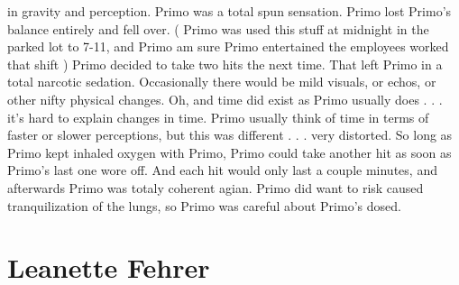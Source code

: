 \documentclass[12pt]{book}
\begin{document}
in gravity and perception. Primo was a total spun sensation. Primo lost Primo's balance entirely and fell over. ( Primo was used this stuff at midnight in the parked lot to 7-11, and Primo am sure Primo entertained the employees worked that shift ) Primo decided to take two hits the next time. That left Primo in a total narcotic sedation. Occasionally there would be mild visuals, or echos, or other nifty physical changes. Oh, and time did exist as Primo usually does . . .  it's hard to explain changes in time. Primo usually think of time in terms of faster or slower perceptions, but this was different . . .  very distorted. So long as Primo kept inhaled oxygen with Primo, Primo could take another hit as soon as Primo's last one wore off. And each hit would only last a couple minutes, and afterwards Primo was totaly coherent agian. Primo did want to risk caused tranquilization of the lungs, so Primo was careful about Primo's dosed.



\chapter{Leanette Fehrer}
\end{document}
